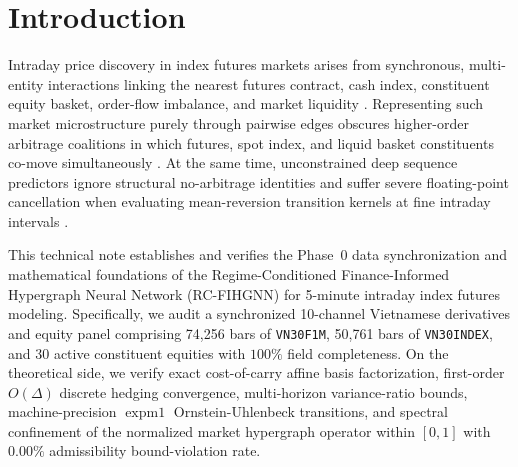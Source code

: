 \section{Introduction}
\label{sec:intro}

Intraday price discovery in index futures markets arises from synchronous, multi-entity interactions linking the nearest futures contract, cash index, constituent equity basket, order-flow imbalance, and market liquidity \citep{MultiMarketLeadLag2023}. Representing such market microstructure purely through pairwise edges obscures higher-order arbitrage coalitions in which futures, spot index, and liquid basket constituents co-move simultaneously \citep{Kim2024HNNSurvey,Lee2025HypergraphMining}. At the same time, unconstrained deep sequence predictors ignore structural no-arbitrage identities and suffer severe floating-point cancellation when evaluating mean-reversion transition kernels at fine intraday intervals \citep{raissi2019physics,Aboussalah2024FINN}.

This technical note establishes and verifies the Phase~0 data synchronization and mathematical foundations of the Regime-Conditioned Finance-Informed Hypergraph Neural Network (RC-FIHGNN) for 5-minute intraday index futures modeling. Specifically, we audit a synchronized 10-channel Vietnamese derivatives and equity panel comprising 74,256 bars of \texttt{VN30F1M}, 50,761 bars of \texttt{VN30INDEX}, and 30 active constituent equities with $100\%$ field completeness. On the theoretical side, we verify exact cost-of-carry affine basis factorization, first-order $O(\Delta)$ discrete hedging convergence, multi-horizon variance-ratio bounds, machine-precision $\operatorname{expm1}$ Ornstein-Uhlenbeck transitions, and spectral confinement of the normalized market hypergraph operator within $[0, 1]$ with $0.00\%$ admissibility bound-violation rate.
